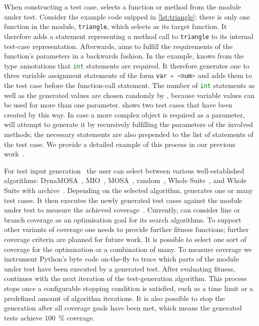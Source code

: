 When constructing a test case,
\pynguin selects a function or method from the module under test.
%
Consider the example code snipped in \cref{lst:triangle}:
%
there is only one function in the module,
\lstinline[language=python]!triangle!,
which \pynguin selects as its target function.
%
It therefore adds a statement representing a method call to
\lstinline[language=python]!triangle!
to its internal test-case representation.
%
Afterwards,
\pynguin aims to fulfill the requirements of the function's parameters
in a backwards fashion.
%
In the example,
\pynguin knows from the type annotations
that \lstinline[language=python]!int! statements are required.
%
It therefore generates one to three variable assignment statements of the form
\lstinline[language=python]!var = <num>!
and adds them to the test case
before the function-call statement.
%
The number of \lstinline[language=python]!int! statements
as well as the generated values are chosen randomly by \pynguin,
because variable values can be used for more than one parameter.
%
 shows two test cases
that have been created by this way.
%
In case a more complex object is required as a parameter,
\pynguin will attempt to generate it
by recursively fulfilling the parameters of the involved methods;
the necessary statements are also prepended
to the list of statements of the test case.
%
We provide a detailed example of this process in our previous work~\cite{LKF21}.
%

For test input generation~
the user can select between various well-established algorithms:
DynaMOSA~\cite{PKT18},
MIO~\cite{Arc17},
MOSA~\cite{PKT15},
random~\cite{PLE+07},
Whole Suite~\cite{FA13},
and Whole Suite with archive~\cite{RVA+17}.
%
Depending on the selected algorithm,
\pynguin generates one or many test cases.
%
It then executes the newly generated test cases
against the module under test
to measure the achieved coverage~.
%
Currently,
\pynguin can consider line or branch coverage as an optimisation goal
for its search algorithms.
%
To support other variants of coverage
one needs to provide further fitness functions;
further coverage criteria are planned for future work.
%
It is possible to select one sort of coverage for the optimisation
or a combination of many.
%
To measure coverage
we instrument Python's byte code on-the-fly to trace
which parts of the module under test have been executed by a generated test.
%
After evaluating fitness,
\pynguin continues with the next iteration of the test-generation algorithm.
%
This process stops
once a configurable stopping condition is satisfied, such as
a time limit or a predefined amount of algorithm iterations.
%
It is also possible to stop the generation
after all coverage goals have been met,
which means the generated tests achieve \SI{100}{\percent} coverage.
%

